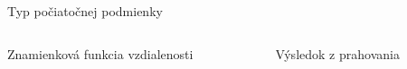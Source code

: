 \documentclass{beamer}
\begin{document}
\begin{frame}{Typ počiatočnej podmienky}
\begin{columns}
\begin{column}{0.5\textwidth}
\centering
  Znamienková funkcia vzdialenosti
  \begin{figure}
	\centering
        \qquad
	\end{figure}
\end{column}
\begin{column}{0.5\textwidth}  %
\centering
  Výsledok z prahovania
  \begin{figure}
	\centering

\end{figure}
\end{column}
\end{columns}
\end{frame}
\end{document}
